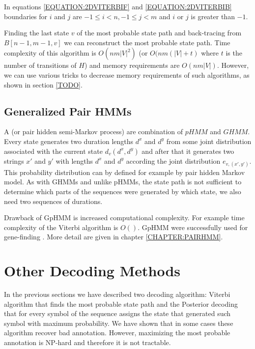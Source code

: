 In equations \ref{EQUATION:2DVITERBIF} and \ref{EQUATION:2DVITERBIB} boundaries for $i$ and $j$ are $
-1\leq i< n,-1\leq j< m$ and $i$ or $j$ is greater than $-1$.


Finding the last state $v$ of the most probable state path and back-tracing from
$B[n-1,m-1,v]$ we can reconstruct the most probable state path. Time
complexity of this algorithm is $O(nm|V|^2)$ (or $O(nm(|V|+t)$ where $t$
is the number of transitions of $H$) and memory requirements are
$O(nm|V|)$. However, we can use various tricks to decrease memory
requirements of such algorithms, as shown in section \ref{TODO}.


\subsection{Generalized Pair HMMs}


A  (or pair hidden semi-Markov
process) are combination of $pHMM$ and $GHMM$. Every state generates two
duration lengths $d^x$ and $d^y$ from some joint distribution associated with
the current state $d_v(d^x,d^y)$ and after that it generates two strings $x'$
and $y'$ with lengths $d^x$ and $d^y$ according the joint distribution
$e_{v,(x',y')}$. This probability distribution can by defined for example by
pair hidden Markov model.  As with GHMMs and unlike pHMMs, the state path is not
sufficient to determine which parts of the sequences were generated by which
state, we also need two sequences of durations.

Drawback of GpHMM is increased computational complexity. For example time
complexity of the Viterbi algorithm is $O()$\cite{}.  GpHMM were successfully used for gene-finding
\cite{Meyer2002,SLAM2003,Alexanderson2004,Majoros2005}. More detail are given in
chapter \ref{CHAPTER:PAIRHMM}.





\section{Other Decoding Methods}
In the previous sections we have described two decoding algorithm: Viterbi algorithm
that finds the most probable state path  and the Posterior decoding that for
every symbol of the sequence assigns the state that generated such symbol with
maximum probability. 
We have shown that in some cases these algorithm recover bad
annotation. However, maximizing the most probable annotation is NP-hard and
therefore it is not tractable.

